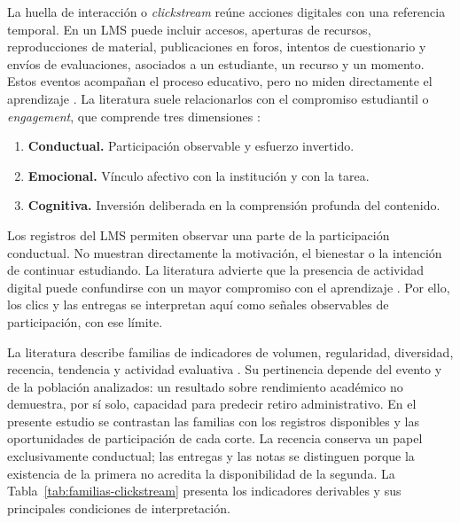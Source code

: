 La huella de interacción o \textit{clickstream} reúne acciones digitales con una referencia temporal. En un LMS puede incluir accesos, aperturas de recursos, reproducciones de material, publicaciones en foros, intentos de cuestionario y envíos de evaluaciones, asociados a un estudiante, un recurso y un momento. Estos eventos acompañan el proceso educativo, pero no miden directamente el aprendizaje \cite{03064190261439624,educsci11090552}. La literatura suele relacionarlos con el compromiso estudiantil o \textit{engagement}, que comprende tres dimensiones \cite{fredricks2004}:
\begin{enumerate}
\item \textbf{Conductual.} Participación observable y esfuerzo invertido.
\item \textbf{Emocional.} Vínculo afectivo con la institución y con la tarea.
\item \textbf{Cognitiva.} Inversión deliberada en la comprensión profunda del contenido.
\end{enumerate}
Los registros del LMS permiten observar una parte de la participación conductual. No muestran directamente la motivación, el bienestar o la intención de continuar estudiando. La literatura advierte que la presencia de actividad digital puede confundirse con un mayor compromiso con el aprendizaje \cite{henrie2015}. Por ello, los clics y las entregas se interpretan aquí como señales observables de participación, con ese límite.

La literatura describe familias de indicadores de volumen, regularidad, diversidad, recencia, tendencia y actividad evaluativa \cite{macfadyendawson2010,agudoperegrina2014,wolff2013,halawa2014}. Su pertinencia depende del evento y de la población analizados: un resultado sobre rendimiento académico no demuestra, por sí solo, capacidad para predecir retiro administrativo. En el presente estudio se contrastan las familias con los registros disponibles y las oportunidades de participación de cada corte. La recencia conserva un papel exclusivamente conductual; las entregas y las notas se distinguen porque la existencia de la primera no acredita la disponibilidad de la segunda. La Tabla~\ref{tab:familias-clickstream} presenta los indicadores derivables y sus principales condiciones de interpretación.


